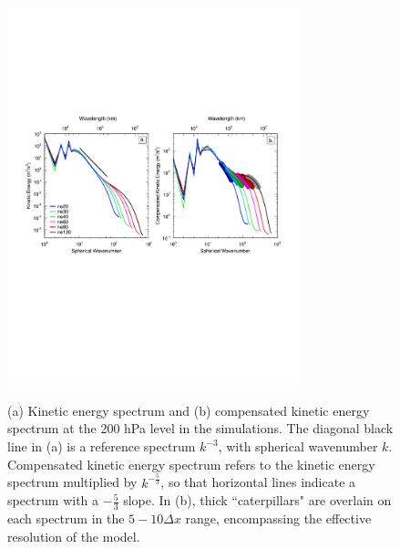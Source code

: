 \documentclass[times]{qjrms4}
\begin{document}
\begin{figure}
\begin{center}
\noindent\includegraphics[width=20pc,angle=0]{figs/temp_kespectra.pdf}\\
\end{center}
\caption{(a) Kinetic energy spectrum and (b) compensated kinetic energy spectrum at the 200 hPa level in the simulations. The diagonal black line in (a) is a reference spectrum $k^{-3}$, with spherical wavenumber $k$. Compensated kinetic energy spectrum refers to the kinetic energy spectrum multiplied by $k^{-\frac{5}{3}}$, so that horizontal lines indicate a spectrum with a $-\frac{5}{3}$ slope. In (b), thick ``caterpillars" are overlain on each spectrum in the $5-10 \Delta x$ range, encompassing the effective resolution of the model.}
\label{fig:2ke}
\end{figure}
\end{document}
